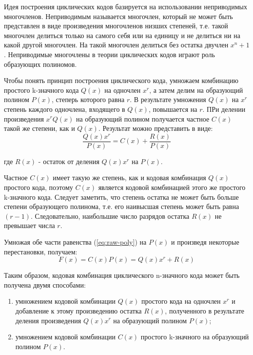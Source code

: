 \documentclass[russian,utf8,simple,emptystyle]{eskdtext}
\begin{document}
Идея построения циклических кодов базируется на использовании неприводимых многочленов. Неприводимым называется многочлен, который не может быть представлен в виде произведения многочленов низших степеней, т.е. такой многочлен делиться только на самого себя или на единицу и не делиться ни на какой другой многочлен. На такой многочлен делиться без остатка двучлен $x^n+1$. Неприводимые многочлены в теории циклических кодов играют роль образующих полиномов.

Чтобы понять принцип построения циклического кода, умножаем комбинацию простого k-значного кода $Q(x)$ на одночлен $x^r$, а затем делим на образующий полином $P(x)$, степерь которого равна $r$. В результате умножения $Q(x)$ на $x^r$ степень каждого одночлена, входящего в $Q(x)$, повышается на $r$. ПРи делении произведения $x^rQ(x)$ на образующий полином получается частное $C(x)$ такой же степени, как и $Q(x)$. Результат можно представить в виде:
\begin{equation} \label{eq:raw-poly}
\frac{Q(x)x^r}{P(x)} = C(x) + \frac{R(x)}{P(x)}
\end{equation}
\begin{ESKDexplanation}
\item[где] $R(x)$ - остаток от деления $Q(x)x^r$ на $P(x)$.
\end{ESKDexplanation}

Частное $C(x)$ имеет такую же степень, как и кодовая комбинация $Q(x)$ простого кода, поэтому $C(x)$ является кодовой комбинацией этого же простого k-значного кода. Следует заметить, что степень остатка не может быть больше степени образующего полинома, т.е. его наивысшая степень может быть равна $(r-1)$. Следовательно, наибольшие число разрядов остатка $R(x)$ не превышает числа $r$.

Умножая обе части равенства (\ref{eq:raw-poly}) на $P(x)$ и произведя некоторые перестановки, получаем:
\begin{equation} \label{eq:made-poly}
F(x) = C(x)P(x) = Q(x)x^r + R(x)
\end{equation}

Таким образом, кодовая комбинация циклического n-значного кода может быть получена двумя способами:
\begin{enumerate}
\item умножением кодовой комбинации $Q(x)$ простого кода на одночлен $x^r$ и добавление к этому произведению остатка $R(x)$, полученного в результате деления произведения $Q(x)x^r$ на образующий полином $P(x)$;
\item умножением кодовой комбинации $C(x)$ простого k-значного на образующий полином $P(x)$.
\end{enumerate}
\end{document}
